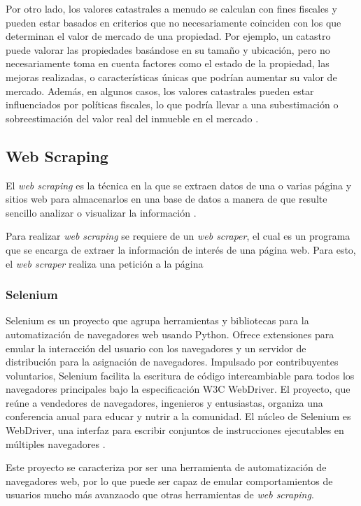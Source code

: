 Por otro lado, los valores catastrales a menudo se calculan con fines fiscales
y pueden estar basados en criterios que no necesariamente coinciden con los que
determinan el valor de mercado de una propiedad. Por ejemplo, un catastro puede
valorar las propiedades basándose en su tamaño y ubicación, pero no necesariamente
toma en cuenta factores como el estado de la propiedad, las mejoras realizadas, o
características únicas que podrían aumentar su valor de mercado. Además, en
algunos casos, los valores catastrales pueden estar influenciados por políticas
fiscales, lo que podría llevar a una subestimación o sobreestimación del valor
real del inmueble en el mercado \cite{sigcdmx}.

\subsection{Web Scraping}
El \textit{web scraping} es la técnica en la que se extraen datos de una o varias
página y sitios web para almacenarlos en una base de datos a manera de que resulte
sencillo analizar o visualizar la información \cite{sirisuriya2015comparative}.

Para realizar \textit{web scraping} se requiere de un \textit{web scraper}, el
cual es un programa que se encarga de extraer la información de interés de una
página web. Para esto, el \textit{web scraper} realiza una petición a la página

\subsubsection{Selenium}

Selenium es un proyecto que agrupa herramientas y bibliotecas para la automatización
de navegadores web usando Python. Ofrece extensiones para emular la interacción del usuario con
los navegadores y un servidor de distribución para la asignación de navegadores.
Impulsado por contribuyentes voluntarios, Selenium facilita la escritura de código
intercambiable para todos los navegadores principales bajo la especificación
W3C WebDriver. El proyecto, que reúne a vendedores de navegadores, ingenieros y
entusiastas, organiza una conferencia anual para educar y nutrir a la comunidad.
El núcleo de Selenium es WebDriver, una interfaz para escribir conjuntos de
instrucciones ejecutables en múltiples navegadores \cite{selenium_webdriver}.

Este proyecto se caracteriza por ser una herramienta de automatización de
navegadores web, por lo que puede ser capaz de emular comportamientos de usuarios
mucho más avanzaodo que otras herramientas de \textit{web scraping}.

